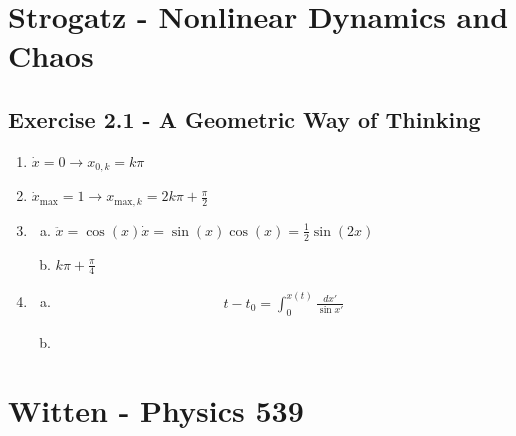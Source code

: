 \documentclass[../main.tex]{subfiles}
\begin{document}
\section{{\sc Strogatz} - Nonlinear Dynamics and Chaos}

\subsection{Exercise 2.1 - A Geometric Way of Thinking}
\begin{enumerate}[1.]
\item $\dot{x}=0\rightarrow x_{0,k}=k\pi$
\item $\dot{x}_\text{max}=1\rightarrow x_{\text{max},k}=2k\pi+\frac{\pi}{2}$
\item
\begin{enumerate}[a)]
\item $\ddot{x}=\cos(x)\dot{x}=\sin(x)\cos(x)=\frac{1}{2}\sin(2x)$
\item $k\pi+\frac{\pi}{4}$
\end{enumerate}

\item
\begin{enumerate}[a)]
\item
\begin{align}
t-t_0=\int_{0}^{x(t)}\frac{dx'}{\sin x'}
\end{align}
\item
\end{enumerate}


\end{enumerate}



\section{{\sc Witten} - Physics 539}
\end{document}
